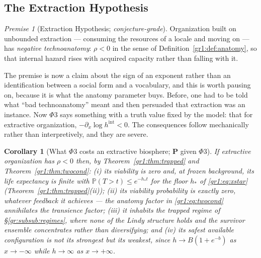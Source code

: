 \documentclass[11pt]{article}
\numberwithin{equation}{section}
\theoremstyle{plain}
\newtheorem{corollary}[theorem]{Corollary}
\theoremstyle{definition}
\theoremstyle{remark}
\newcommand{\PP}{\mathbb{P}}
\newtheorem{premise}{Premise}
\begin{document}
\subsection{The Extraction Hypothesis}\label{gr:sub:extraction}

\setcounter{premise}{2} %
\begin{premise}[Extraction Hypothesis; \emph{conjecture-grade}]
\label{gr:phi3}
Organization built on unbounded extraction --- consuming the resources
of a locale and moving on --- has \emph{negative technoanatomy}:
$\rho<0$ in the sense of Definition~\ref{gr1:def:anatomy}, so that
internal hazard rises with acquired capacity rather than falling with
it.
\end{premise}

The premise is now a claim about the sign of an exponent rather than an
identification between a social form and a vocabulary, and this is worth
pausing on, because it is what the anatomy parameter buys. Before, one
had to be told what ``bad technoanatomy'' meant and then persuaded that
extraction was an instance. Now $\Phi3$ says something with a truth
value fixed by the model: that for extractive organization,
$-\partial_x\log h^{\mathrm{int}}<0$. The consequences follow
mechanically rather than interpretively, and they are severe.

\begin{corollary}[What $\Phi3$ costs an extractive biosphere; \textbf{P}
given $\Phi3$]\label{gr:cor:extractcost}
If extractive organization has $\rho<0$ then, by
Theorem~\ref{gr1:thm:trapped} and Theorem~\ref{gr1:thm:twocond}:
\emph{(i)} its viability is zero and, at frozen background, its life
expectancy is finite with $\PP(T>t)\le e^{-h_\ast t}$ for the floor
$h_\ast$ of \eqref{gr1:eq:xstar} (Theorem~\ref{gr1:thm:trapped}(ii));
\emph{(ii)} its viability probability is \emph{exactly zero}, whatever
feedback it achieves --- the anatomy factor in \eqref{gr1:eq:twocond}
annihilates the transience factor;
\emph{(iii)} it inhabits the trapped regime of
\S\ref{gr:subsub:regimes}, where none of the Lindy structure holds and
the survivor ensemble concentrates rather than diversifying;
and \emph{(iv)} its safest available configuration is not its strongest
but its \emph{weakest}, since $h\to B(1+e^{-b})$ as $x\to-\infty$ while
$h\to\infty$ as $x\to+\infty$.
\end{corollary}
\end{document}
